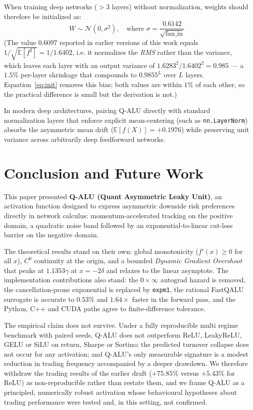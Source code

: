 \documentclass[conference]{IEEEtran}
\begin{document}
When training deep networks ($>3$ layers) without normalization, weights should therefore be initialized as:
\begin{equation}
W \sim \mathcal{N}\left(0, \sigma^2\right), \quad \text{where } \sigma = \frac{0.6142}{\sqrt{\text{fan\_in}}}
\label{eq:init}
\end{equation}
(The value $0.6097$ reported in earlier versions of this work equals $1/\sqrt{\mathbb{E}[f^2]} = 1/1.6402$, i.e. it normalizes the \emph{RMS} rather than the variance, which leaves each layer with an output variance of $1.6283^2/1.6402^2 = 0.985$ --- a $1.5\%$ per-layer shrinkage that compounds to $0.9855^{L}$ over $L$ layers. Equation~\eqref{eq:init} removes this bias; both values are within $1\%$ of each other, so the practical difference is small but the derivation is not.)

In modern deep architectures, pairing Q-ALU directly with standard normalization layers that enforce explicit mean-centering (such as \texttt{nn.LayerNorm}) absorbs the asymmetric mean drift ($\mathbb{E}[f(X)] = +0.1976$) while preserving unit variance across arbitrarily deep feedforward networks.

\section{Conclusion and Future Work}
This paper presented \textbf{Q-ALU (Quant Asymmetric Leaky Unit)}, an activation function designed to express asymmetric downside risk preferences directly in network calculus: momentum-accelerated tracking on the positive domain, a quadratic noise band followed by an exponential-to-linear cut-loss barrier on the negative domain.

The theoretical results stand on their own: global monotonicity ($f'(x) \ge 0$ for all $x$), $C^0$ continuity at the origin, and a bounded \textit{Dynamic Gradient Overshoot} that peaks at $1.1353\gamma$ at $x = -2\delta$ and relaxes to the linear asymptote. The implementation contributions also stand: the $0 \times \infty$ autograd hazard is removed, the cancellation-prone exponential is replaced by \texttt{expm1}, the rational FastQALU surrogate is accurate to $0.53\%$ and $1.64\times$ faster in the forward pass, and the Python, C++ and CUDA paths agree to finite-difference tolerance.

The empirical claim does not survive. Under a fully reproducible multi regime benchmark with paired seeds, Q-ALU does not outperform ReLU, LeakyReLU, GELU or SiLU on return, Sharpe or Sortino; the predicted turnover collapse does not occur for any activation; and Q-ALU's only measurable signature is a modest reduction in trading frequency accompanied by a deeper drawdown. We therefore withdraw the trading results of the earlier draft ($+75.85\%$ versus $+5.43\%$ for ReLU) as non-reproducible rather than restate them, and we frame Q-ALU as a principled, numerically robust activation whose behavioural hypotheses about trading performance were tested and, in this setting, not confirmed.
\end{document}
